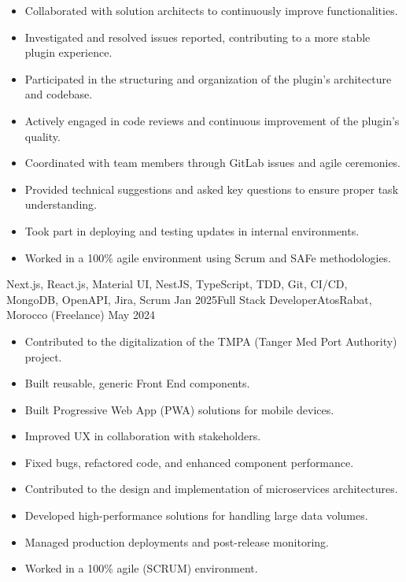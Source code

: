 \begin{experiences}
{\begin{itemize}
                \item Collaborated with solution architects to continuously improve functionalities.
                \item Investigated and resolved issues reported, contributing to a more stable plugin experience.
                \item Participated in the structuring and organization of the plugin's architecture and codebase.
                \item Actively engaged in code reviews and continuous improvement of the plugin's quality.
                \item Coordinated with team members through GitLab issues and agile ceremonies.
                \item Provided technical suggestions and asked key questions to ensure proper task understanding.
                \item Took part in deploying and testing updates in internal environments.
                \item Worked in a 100\% agile environment using Scrum and SAFe methodologies.\\
            \end{itemize}}
            {Next.js, React.js, Material UI, NestJS, TypeScript, TDD, Git, CI/CD, MongoDB, OpenAPI, Jira, Scrum}
    \emptySeparator
     \experience
        {Jan 2025}{Full Stack Developer}{Atos}{Rabat, Morocco (Freelance)}
        {May 2024}
            {\begin{itemize}
                \item Contributed to the digitalization of the TMPA (Tanger Med Port Authority) project.
                \item Built reusable, generic Front End components.
                \item Built Progressive Web App (PWA) solutions for mobile devices.
                \item Improved UX in collaboration with stakeholders.
                \item Fixed bugs, refactored code, and enhanced component performance.
                \item Contributed to the design and implementation of microservices architectures.
                \item Developed high-performance solutions for handling large data volumes.
                \item Managed production deployments and post-release monitoring.
                \item Worked in a 100\% agile (SCRUM) environment.

\end{itemize}}
\end{experiences}

